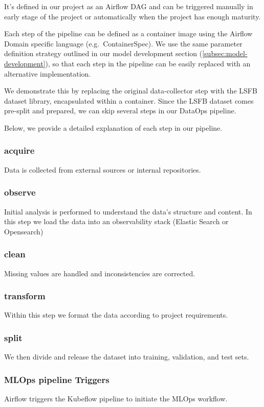 It's defined in our project as an Airflow DAG and can be triggered manually in early stage of the project or
automatically when the project has enough maturity.

Each step of the pipeline can be defined as a container image using the Airflow Domain specific language (e.g.\ ContainerSpec).
We use the same parameter definition strategy outlined in our model development section (\ref{subsec:model-development}),
so that each step in the pipeline can be easily replaced with an alternative implementation.

We demonstrate this by replacing the original data-collector step with the LSFB dataset library\cite{9534336}, encapsulated within a container.
Since the LSFB dataset comes pre-split and prepared, we can skip several steps in our DataOps pipeline.

Below, we provide a detailed explanation of each step in our pipeline.
\subsubsection{acquire}
Data is collected from external sources or internal repositories.

\subsubsection{observe}
Initial analysis is performed to understand the data's structure and content.
In this step we load the data into an observability stack (Elastic Search or Opensearch)

\subsubsection{clean}
Missing values are handled and inconsistencies are corrected.

\subsubsection{transform}
Within this step we format the data according to project requirements.

\subsubsection{split}
We then divide and release the dataset into training, validation, and test sets.

\subsubsection{MLOps pipeline Triggers}
Airflow triggers the Kubeflow pipeline to initiate the MLOps workflow.

